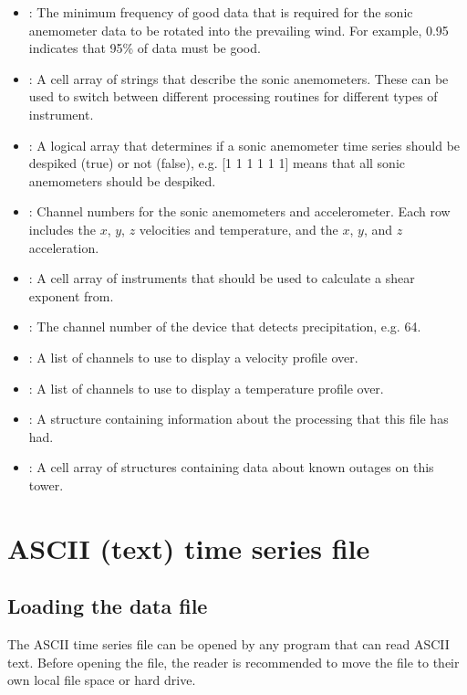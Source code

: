 \begin{itemize}
\item {}: The minimum frequency of good data that is required for the sonic anemometer data to be rotated into the prevailing wind. For example, 0.95 indicates that 95\% of data must be good.
\item {}: A cell array of strings that describe the sonic anemometers. These can be used to switch between different processing routines for different types of instrument.
\item {}: A logical array that determines if a sonic anemometer time series should be despiked (true) or not (false), e.g. [1 1 1 1 1 1] means that all sonic anemometers should be despiked.
\item {}: Channel numbers for the sonic anemometers and accelerometer. Each row includes the $x$, $y$, $z$ velocities and temperature, and the $x$, $y$, and $z$ acceleration.
\item {}: A cell array of instruments that should be used to calculate a shear exponent from.
\item {}: The channel number of the device that detects precipitation, e.g. 64.
\item {}: A list of channels to use to display a velocity profile over.
\item {}: A list of channels to use to display a temperature profile over.
\item {}: A structure containing information about the processing that this file has had.
\item {}: A cell array of structures containing data about known outages on this tower.
\end{itemize}

\newpage
\section{ASCII (text) time series file\label{s:HFASCII}}

\subsection{Loading the data file}
The ASCII time series file can be opened by any program that can read ASCII text. Before opening the file, the reader is recommended to move the file to their own local file space or hard drive.

